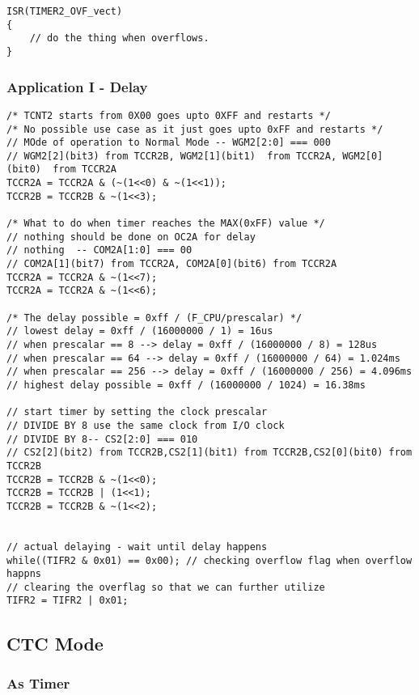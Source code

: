 \documentclass{article}
\begin{document}
\begin{verbatim}
ISR(TIMER2_OVF_vect)
{
    // do the thing when overflows.
}
\end{verbatim}



\subsubsection{Application I - Delay}
\begin{verbatim}
/* TCNT2 starts from 0X00 goes upto 0XFF and restarts */
/* No possible use case as it just goes upto 0xFF and restarts */
// MOde of operation to Normal Mode -- WGM2[2:0] === 000
// WGM2[2](bit3) from TCCR2B, WGM2[1](bit1)  from TCCR2A, WGM2[0](bit0)  from TCCR2A
TCCR2A = TCCR2A & (~(1<<0) & ~(1<<1));
TCCR2B = TCCR2B & ~(1<<3);

/* What to do when timer reaches the MAX(0xFF) value */
// nothing should be done on OC2A for delay
// nothing  -- COM2A[1:0] === 00
// COM2A[1](bit7) from TCCR2A, COM2A[0](bit6) from TCCR2A
TCCR2A = TCCR2A & ~(1<<7);
TCCR2A = TCCR2A & ~(1<<6);
    
/* The delay possible = 0xff / (F_CPU/prescalar) */
// lowest delay = 0xff / (16000000 / 1) = 16us
// when prescalar == 8 --> delay = 0xff / (16000000 / 8) = 128us
// when prescalar == 64 --> delay = 0xff / (16000000 / 64) = 1.024ms
// when prescalar == 256 --> delay = 0xff / (16000000 / 256) = 4.096ms
// highest delay possible = 0xff / (16000000 / 1024) = 16.38ms

// start timer by setting the clock prescalar
// DIVIDE BY 8 use the same clock from I/O clock
// DIVIDE BY 8-- CS2[2:0] === 010
// CS2[2](bit2) from TCCR2B,CS2[1](bit1) from TCCR2B,CS2[0](bit0) from TCCR2B
TCCR2B = TCCR2B & ~(1<<0);
TCCR2B = TCCR2B | (1<<1);
TCCR2B = TCCR2B & ~(1<<2);


// actual delaying - wait until delay happens
while((TIFR2 & 0x01) == 0x00); // checking overflow flag when overflow happns
// clearing the overflag so that we can further utilize
TIFR2 = TIFR2 | 0x01;
\end{verbatim}

\subsection{CTC Mode}
\subsubsection{As Timer}
\end{document}
